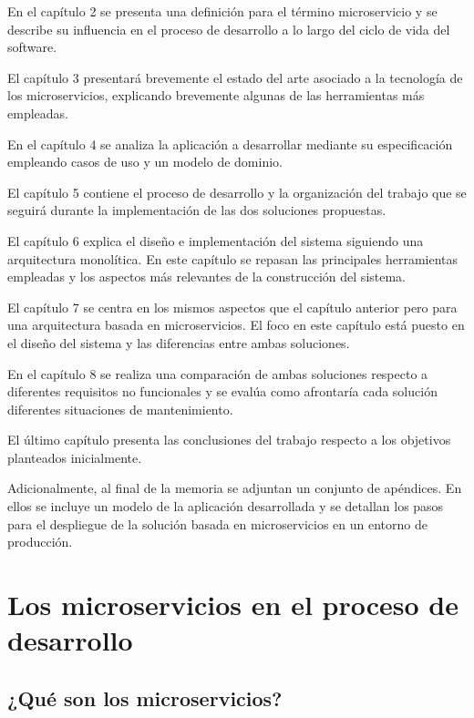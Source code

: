 \documentclass[11pt,spanish,listoffigures]{tfgetsinf}
\begin{document}
En el capítulo 2 se presenta una definición para el término microservicio y se describe su influencia en el proceso de desarrollo a lo largo del ciclo de vida del software.

El capítulo 3 presentará brevemente el estado del arte asociado a la tecnología de los microservicios, explicando brevemente algunas de las herramientas más empleadas.

En el capítulo 4 se analiza la aplicación a desarrollar mediante su especificación   empleando casos de uso y un modelo de dominio.

El capítulo 5 contiene el proceso de desarrollo y la organización del trabajo que se seguirá durante la implementación de las dos soluciones propuestas.

El capítulo 6 explica el diseño e implementación del sistema siguiendo una arquitectura monolítica. En este capítulo se repasan las principales herramientas empleadas y los aspectos más relevantes de la construcción del sistema.

El capítulo 7 se centra en los mismos aspectos que el capítulo anterior pero para una arquitectura basada en microservicios. El foco en este capítulo está puesto en el diseño del sistema y las diferencias entre ambas soluciones.

En el capítulo 8 se realiza una comparación de ambas soluciones respecto a diferentes requisitos no funcionales  y se evalúa como afrontaría cada solución diferentes situaciones de mantenimiento.

El último capítulo presenta las conclusiones del trabajo respecto a los objetivos planteados inicialmente.

Adicionalmente, al final de la memoria se adjuntan un conjunto de apéndices. En ellos  se incluye un modelo de la aplicación desarrollada y se detallan los pasos para el despliegue de la solución basada en microservicios en un entorno de producción.

%

\chapter{Los microservicios en el proceso de desarrollo}

\section{¿Qué son los microservicios?}
\end{document}
